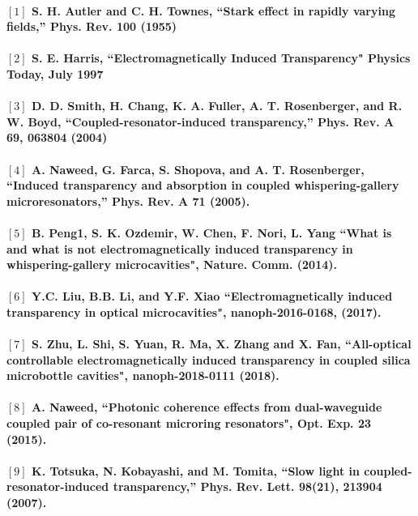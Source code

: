 \paragraph{\normalfont \large $[1]$ S. H. Autler and C. H. Townes, “Stark effect in rapidly varying fields,” Phys. Rev. \textbf{100} (1955) \\ 
\\$[2]$ S. E. Harris, “Electromagnetically Induced Transparency" Physics Today, July 1997 \\
\\$[3]$ D. D. Smith, H. Chang, K. A. Fuller, A. T. Rosenberger, and R. W. Boyd, “Coupled-resonator-induced transparency,” Phys. Rev. A \textbf{69}, 063804 (2004) \\
\\$[4]$  A. Naweed, G. Farca, S. Shopova, and A. T. Rosenberger, “Induced transparency and absorption in coupled
whispering-gallery microresonators,” Phys. Rev. A \textbf{71} (2005).\\
\\ $[5]$ B. Peng1, S. K. Ozdemir, W. Chen, F. Nori, L. Yang “What is and what is not electromagnetically induced transparency in whispering-gallery microcavities", Nature. Comm. (2014).\\
\\ $[6]$ Y.C. Liu, B.B. Li, and Y.F. Xiao “Electromagnetically induced transparency in optical microcavities", nanoph-2016-0168, (2017).\\
\\ $[7]$ S. Zhu, L. Shi, S. Yuan, R. Ma, X. Zhang and X. Fan, “All-optical controllable electromagnetically induced transparency in coupled silica microbottle cavities", nanoph-2018-0111 (2018).\\
\\ $[8]$ A. Naweed, “Photonic coherence effects from dual-waveguide coupled pair of co-resonant microring resonators", Opt. Exp. \textbf{23} (2015).\\
\\ $[9]$ K. Totsuka, N. Kobayashi, and M. Tomita, “Slow light in coupled-resonator-induced transparency,” Phys. Rev.
Lett. \textbf{98}(21), 213904 (2007).}